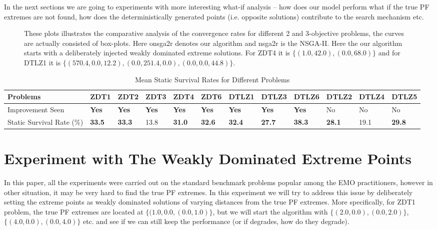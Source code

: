 \documentclass[journal]{IEEEtran}
\let\MYoriglatexcaption\caption
\renewcommand{\caption}[2][\relax]{\MYoriglatexcaption[#2]{#2}}
\begin{document}
In the next sections we are going to experiments with more interesting what-if analysis -- how does our model perform what if the true PF extremes are not found, how does the deterministically generated points (i.e. opposite solutions) contribute to the search mechanism etc.
%
\begin{figure*}[pb!]
	\centering
	\hfill
	\caption{These plots illustrates the comparative analysis of the convergence rates for different 2 and 3-objective problems, the curves are actually consisted of box-plots. Here onsga2r denotes our algorithm and nsga2r is the NSGA-II. Here the our algorithm starts with a deliberately injected weakly dominated extreme solutions. For ZDT4 it is \(\{(1.0, 42.0), (0.0, 68.0)\}\) and for DTLZ1 it is \(\{(570.4, 0.0, 12.2),(0.0, 251.4, 0.0),(0.0, 0.0, 44.8)\}\).}
	\label{plot:weak-hv}
\end{figure*}
%
%
\begin{table*}[tp!]
\caption{Mean Static Survival Rates for Different Problems}
\label{table:survival}
\centering
{\renewcommand{\arraystretch}{1.5}
\begin{tabular}{l|llllllll|lll}
Problems	& ZDT1            & ZDT2            & ZDT3           & ZDT4            & ZDT6            & DTLZ1           & DTLZ3           & DTLZ6           & DTLZ2           & DTLZ4    & DTLZ5	\\ \hline
Improvement Seen            & \textbf{Yes}  & \textbf{Yes}  & \textbf{Yes} & \textbf{Yes}  & \textbf{Yes}  & \textbf{Yes}  & \textbf{Yes}  & \textbf{Yes}  & No              & No       & No      \\ \hline
	Static Survival Rate (\(\%\)) & \textbf{33.5} & \textbf{33.3} & 13.8           & \textbf{31.0} & \textbf{32.6} & \textbf{32.4} & \textbf{27.7} & \textbf{38.3} & \textbf{28.1} & 19.1 & \textbf{29.8} \\ \hline
\end{tabular}}
\end{table*}
%
\section{Experiment with The Weakly Dominated Extreme Points}
\label{sec:weak-extremes}
In this paper, all the experiments were carried out on the standard benchmark problems popular among the EMO practitioners, however in other situation, it may be very hard to find the true PF extremes. In this experiment we will try to address this issue by deliberately setting the extreme points as weakly dominated solutions of varying distances from the true PF extremes. More specifically, for ZDT1 problem, the true PF extremes are located at \(\{(1.0, 0.0, (0.0, 1.0)\}\), but we will start the algorithm with \(\{(2.0, 0.0), (0.0, 2.0)\}\), \(\{(4.0, 0.0), (0.0, 4.0)\}\) etc. and see if we can still keep the performance (or if degrades, how do they degrade).
\end{document}
